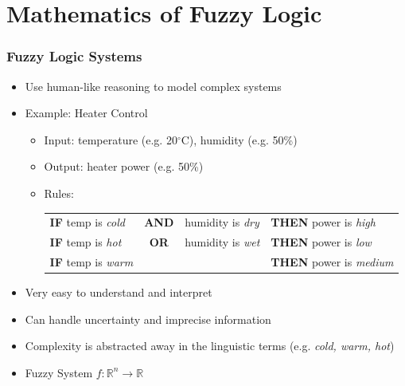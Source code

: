 \documentclass[
	10pt,
	t		%
]{beamer}
\begin{document}
\section{Mathematics of Fuzzy Logic}
\begin{frame}
	\frametitle{Fuzzy Logic Systems}

	\begin{itemize}
		\item Use human-like reasoning to model complex systems
		\item Example: Heater Control
		      \begin{itemize}
			      \item Input: temperature (e.g. 20$^{\circ}$C), humidity (e.g. 50\%)
			      \item Output: heater power (e.g. 50\%)
			      \item Rules:
			            \begin{tabular}{lcll}
				            \textbf{IF}  temp is \textit{cold} & \textbf{AND} & humidity is \textit{dry} & \textbf{THEN}  power is \textit{high}   \\
				            \textbf{IF}  temp is \textit{hot}  & \textbf{OR}  & humidity is \textit{wet} & \textbf{THEN}  power is \textit{low}    \\
				            \textbf{IF}  temp is \textit{warm} &              &                          & \textbf{THEN}  power is \textit{medium} \\
			            \end{tabular}
		      \end{itemize}
		\item Very easy to understand and interpret
		\item Can handle uncertainty and imprecise information
		\item Complexity is abstracted away in the linguistic terms (e.g. \textit{cold, warm, hot})
		\item Fuzzy System $f: \mathbb{R}^n \rightarrow \mathbb{R}$
	\end{itemize}

\end{frame}
\end{document}
